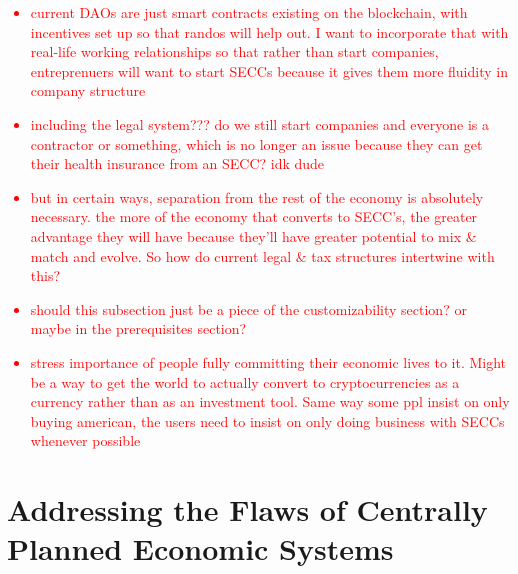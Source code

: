 \documentclass{article}[10pt]
\begin{document}
\textcolor{red}{\begin{itemize}
    \item current DAOs are just smart contracts existing on the blockchain, with incentives set up so that randos will help out. 
    I want to incorporate that with real-life working relationships so that rather than start companies, entreprenuers will want to start SECCs because it gives them more fluidity in company structure
    \item including the legal system??? 
    do we still start companies and everyone is a contractor or something, which is no longer an issue because they can get their health insurance from an SECC? 
    idk dude
    \item but in certain ways, separation from the rest of the economy is absolutely necessary. 
    the more of the economy that converts to SECC's, the greater advantage they will have because they'll have greater potential to mix \& match and evolve. 
    So how do current legal \& tax structures intertwine with this?
    \item should this subsection just be a piece of the customizability section? 
    or maybe in the prerequisites section?
    \item stress importance of people fully committing their economic lives to it. 
    Might be a way to get the world to actually convert to cryptocurrencies as a currency rather than as an investment tool. 
    Same way some ppl insist on only buying american, the users need to insist on only doing business with SECCs whenever possible
\end{itemize}}












\section{Addressing the Flaws of Centrally Planned Economic Systems}
\label{section:CentralFlaws}
\end{document}
